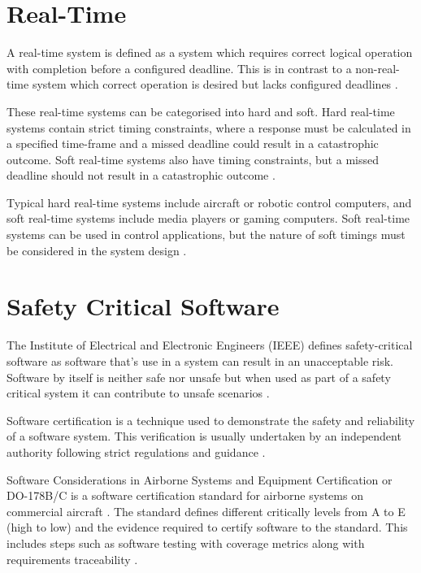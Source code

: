 \graphicspath{{main/introduction/graphics/}}

\section{Real-Time}
A real-time system is defined as a system which requires correct logical operation with completion before a configured deadline. This is in contrast to a non-real-time system which correct operation is desired but lacks configured deadlines \autocite{kaviRealTimeSystems2009}.

These real-time systems can be categorised into hard and soft. Hard real-time systems contain strict timing constraints, where a response must be calculated in a specified time-frame and a missed deadline could result in a catastrophic outcome. Soft real-time systems also have timing constraints, but a missed deadline should not result in a catastrophic outcome \autocite{wangRealTimeSystems}.

Typical hard real-time systems include aircraft or robotic control computers, and soft real-time systems include media players or gaming computers. Soft real-time systems can be used in control applications, but the nature of soft timings must be considered in the system design \autocite{kaviRealTimeSystems2009}.

\section{Safety Critical Software}
The Institute of Electrical and Electronic Engineers (IEEE) defines safety-critical software as software that's use in a system can result in an unacceptable risk. Software by itself is neither safe nor unsafe but when used as part of a safety critical system it can contribute to unsafe scenarios \autocite{riersonDevelopingSafetyCriticalSoftware2017}.

Software certification is a technique used to demonstrate the safety and reliability of a software system. This verification is usually undertaken by an independent authority following strict regulations and guidance \autocite{denneySoftwareCertificationSoftware2005}.

Software Considerations in Airborne Systems and Equipment Certification or DO-178B/C is a software certification standard for airborne systems on commercial aircraft \autocite{WhatDO178B}. The standard defines different critically levels from A to E (high to low) and the evidence required to certify software to the standard. This includes steps such as software testing with coverage metrics along with requirements traceability \autocite{brosgolDO178CNewStandard2010}.

